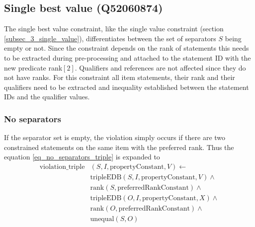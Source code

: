 \documentclass[hyperref,bachelorofscience,fleqn]{cgvpub}
\begin{document}
\subsection{Single best value (Q52060874)}
The single best value constraint, like the single value constraint (section \ref{subsec_3_single_value}), differentiates between the set of separators \(S\) being empty or not. Since the constraint depends on the rank of statements this needs to be extracted during pre-processing and attached to the statement ID with the new predicate rank\([2]\). Qualifiers and references are not affected since they do not have ranks. For this constraint all item statements, their rank and their qualifiers need to be extracted and inequality established between the statement IDs and the qualifier values.\\

\subsubsection{No separators}
If the separator set is empty, the violation simply occurs if there are two constrained statements on the same item with the preferred rank. Thus the equation \ref{eq_no_separators_triple} is expanded to
\begin{equation}
\begin{split}
\text{violation\_triple}&(S, I, \text{propertyConstant}, V) \leftarrow \\
&\text{tripleEDB}(S, I, \text{propertyConstant}, V) \wedge \\
&\text{rank}(S, \text{preferredRankConstant}) \wedge \\
&\text{tripleEDB}(O, I, \text{propertyConstant}, X) \wedge \\
&\text{rank}(O, \text{preferredRankConstant}) \wedge \\
&\text{unequal}(S, O)
\end{split}
\end{equation}
\end{document}
